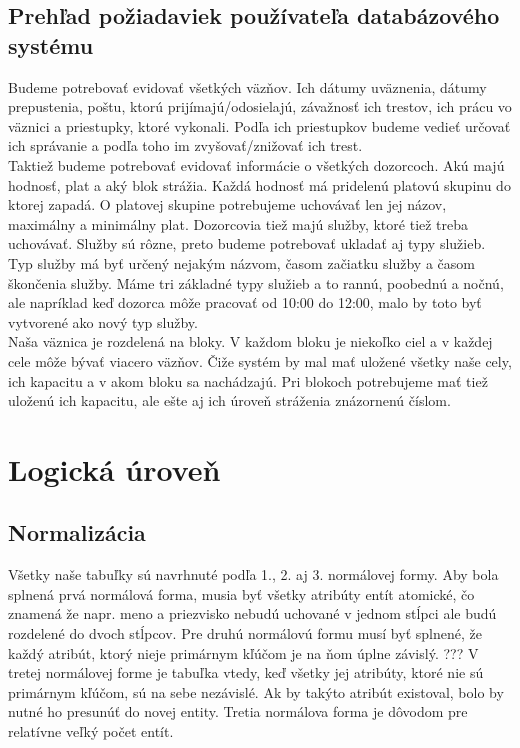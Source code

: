 \documentclass[slovak, 12pt, Times New Roman]{article}
\begin{document}
		\subsection{Prehľad požiadaviek používateľa databázového systému}
			Budeme potrebovať evidovať všetkých väzňov. Ich dátumy uväznenia, dátumy prepustenia, poštu, ktorú prijímajú/odosielajú, závažnosť 
			ich trestov, ich prácu vo väznici a priestupky, ktoré vykonali. Podľa ich priestupkov budeme vedieť určovať ich správanie a podľa 
			toho im zvyšovať/znižovať ich trest. \\
			Taktiež budeme potrebovať evidovať informácie o všetkých dozorcoch. Akú majú hodnosť, plat a aký blok strážia. Každá hodnosť má 
			pridelenú platovú skupinu do ktorej zapadá. O platovej skupine potrebujeme uchovávať len jej názov, maximálny a minimálny plat. 
			Dozorcovia tiež majú služby, ktoré tiež treba uchovávať. Služby sú rôzne, preto budeme potrebovať ukladať aj typy služieb. Typ 
			služby má byť určený nejakým názvom, časom začiatku služby a časom škončenia služby. Máme tri základné typy služieb a to rannú, 
			poobednú a nočnú, ale napríklad keď dozorca môže pracovať od 10:00 do 12:00, malo by toto byť vytvorené ako nový typ služby.	\\
			Naša väznica je rozdelená na bloky. V každom bloku je niekoľko ciel a v každej cele môže bývať viacero väzňov. Čiže systém by mal 
			mať uložené všetky naše cely, ich kapacitu a v akom bloku sa nachádzajú. Pri blokoch potrebujeme mať tiež uloženú ich kapacitu, ale 
			ešte aj ich úroveň stráženia znázornenú číslom. 
	\section{Logická úroveň}
		\subsection{Normalizácia}
			Všetky naše tabuľky sú navrhnuté podľa 1., 2. aj 3. normálovej formy. Aby bola splnená prvá normálová forma, musia byť všetky 
			atribúty entít atomické, čo znamená že napr. meno a priezvisko nebudú uchované v jednom stĺpci ale budú rozdelené do dvoch stĺpcov. 
			Pre druhú normálovú formu musí byť splnené, že každý atribút, ktorý nieje primárnym kľúčom je na ňom úplne závislý. ??? V tretej 
			normálovej forme je tabuľka vtedy, keď všetky jej atribúty, ktoré nie sú primárnym kľúčom, sú na sebe nezávislé. Ak by takýto atribút existoval, bolo by nutné ho presunúť do novej entity. Tretia normálova forma je dôvodom pre relatívne veľký počet entít.
\end{document}
